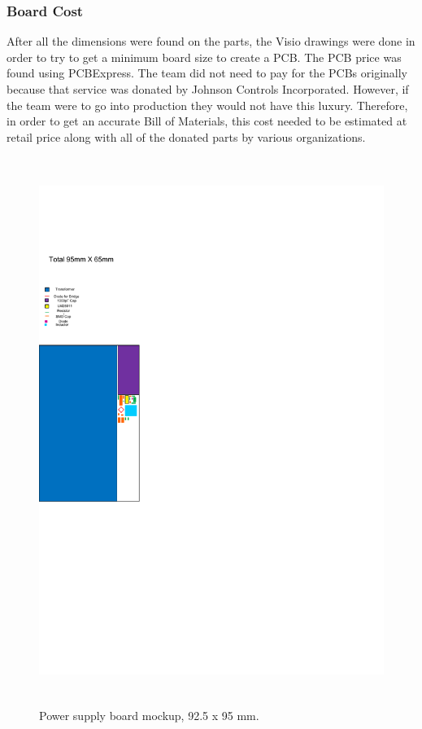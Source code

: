 \subsubsection{Board Cost}
After all the dimensions were found on the parts, the Visio drawings were done in order to try to get a minimum board size to create a PCB. The PCB price was found using PCBExpress. The team did not need to pay for the PCBs originally because that service was donated by Johnson Controls Incorporated. However, if the team were to go into production they would not have this luxury. Therefore, in order to get an accurate Bill of Materials, this cost needed to be estimated at retail price along with all of the donated parts by various organizations. 
\begin{figure}[htbp]
  \centering
  \includegraphics[height=7in]{business/b_includes/Power_Supply_board_and_key}
  \caption{Power supply board mockup, 92.5 x 95 mm.}
  \label{fig:power_supply_board_mockup}
\end{figure}
